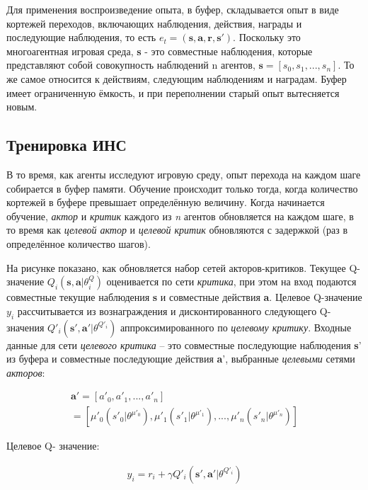 Для применения воспроизведение опыта, в буфер, складывается опыт в виде кортежей переходов, включающих наблюдения, действия, награды и последующие наблюдения, то есть $e_t = (\mathbf{s, a, r, s'})$. Поскольку это многоагентная игровая среда, \textbf{s} - это совместные наблюдения, которые представляют собой совокупность наблюдений n агентов, $\mathbf{s} = [s_0, s_1, ..., s_n]$. То же самое относится к действиям, следующим наблюдениям и наградам. Буфер имеет ограниченную ёмкость, и при переполнении старый опыт вытесняется новым.

\subsection{Тренировка ИНС}

В то время, как агенты исследуют игровую среду, опыт перехода на каждом шаге собирается в буфер памяти. Обучение происходит только тогда, когда количество кортежей в буфере превышает определённую величину. Когда начинается обучение, \textit{актор} и \textit{критик} каждого из \textit{n} агентов обновляется на каждом шаге, в то время как \textit{целевой актор} и \textit{целевой критик} обновляются с задержкой (раз в определённое количество шагов).

На рисунке  показано, как обновляется набор сетей акторов-критиков. Текущее Q-значение $Q_i(\mathbf{s, a}|\theta ^Q_i)$ оценивается по сети \textit{критика}, при этом на вход подаются совместные текущие наблюдения \textbf{s} и совместные действия \textbf{a}. Целевое Q-значение $y_i$ рассчитывается из вознаграждения и дисконтированного следующего Q-значения $Q'_i(\mathbf{s', a'}|\theta ^{Q'_i})$ аппроксимированного по \textit{целевому критику}. Входные данные для сети \textit{целевого критика} – это совместные последующие наблюдения \textbf{s}' из буфера и совместные последующие действия \textbf{a}', выбранные \textit{целевыми} сетями \textit{акторов}:

\begin{equation}
    \begin{multlined}
        \mathbf{a'} = [a'_0, a'_1, ..., a'_n] \\
        = [\mu'_0(s'_0|\theta^{\mu'_0}), \mu'_1(s'_1|\theta^{\mu'_1}), ..., \mu'_n(s'_n|\theta^{\mu'_n})]
    \end{multlined}
\end{equation}

Целевое Q- значение:

\begin{equation}
    \begin{multlined}
        y_i = r_i + \gamma Q'_i(\mathbf{s', a'}|\theta^{Q'_i})
    \end{multlined}
\end{equation}


